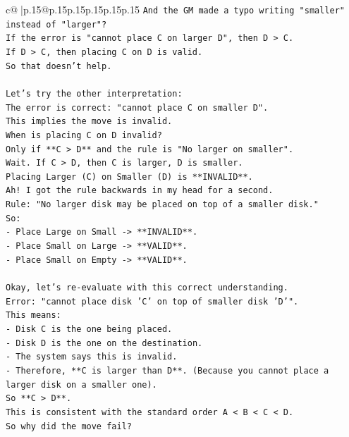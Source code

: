 \documentclass{article}
\begin{document}
{\begin{supertabular}{c@{$\;$}|p{.15\linewidth}@{}p{.15\linewidth}p{.15\linewidth}p{.15\linewidth}p{.15\linewidth}p{.15\linewidth}}
{{{\texttt{And the GM made a typo writing "smaller" instead of "larger"?} \\
\texttt{If the error is "cannot place C on larger D", then D > C.} \\
\texttt{If D > C, then placing C on D is valid.} \\
\texttt{So that doesn't help.} \\
\\ 
\texttt{Let's try the other interpretation:} \\
\texttt{The error is correct: "cannot place C on smaller D".} \\
\texttt{This implies the move is invalid.} \\
\texttt{When is placing C on D invalid?} \\
\texttt{Only if **C > D** and the rule is "No larger on smaller".} \\
\texttt{Wait. If C > D, then C is larger, D is smaller.} \\
\texttt{Placing Larger (C) on Smaller (D) is **INVALID**.} \\
\texttt{Ah! I got the rule backwards in my head for a second.} \\
\texttt{Rule: "No larger disk may be placed on top of a smaller disk."} \\
\texttt{So:} \\
\texttt{{-} Place Large on Small {-}> **INVALID**.} \\
\texttt{{-} Place Small on Large {-}> **VALID**.} \\
\texttt{{-} Place Small on Empty {-}> **VALID**.} \\
\\ 
\texttt{Okay, let's re{-}evaluate with this correct understanding.} \\
\texttt{Error: "cannot place disk 'C' on top of smaller disk 'D'".} \\
\texttt{This means:} \\
\texttt{{-} Disk C is the one being placed.} \\
\texttt{{-} Disk D is the one on the destination.} \\
\texttt{{-} The system says this is invalid.} \\
\texttt{{-} Therefore, **C is larger than D**. (Because you cannot place a larger disk on a smaller one).} \\
\texttt{So **C > D**.} \\
\texttt{This is consistent with the standard order A < B < C < D.} \\
\texttt{So why did the move fail?} \\
}}}
\end{supertabular}}
\end{document}
